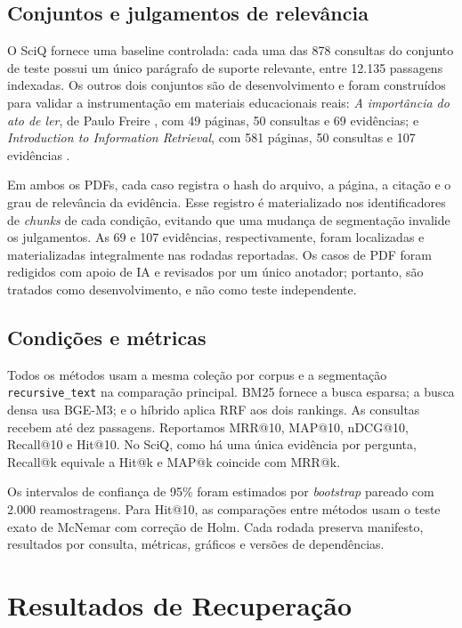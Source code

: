 \documentclass[12pt]{article}
\begin{document}
\subsection{Conjuntos e julgamentos de relevância}

O SciQ \cite{sciq2017} fornece uma baseline controlada: cada uma das 878
consultas do conjunto de teste possui um único parágrafo de suporte relevante,
entre 12.135 passagens indexadas. Os outros dois conjuntos são de
desenvolvimento e foram construídos para validar a instrumentação em materiais
educacionais reais: \textit{A importância do ato de ler}, de Paulo Freire
\cite{freire1989}, com 49 páginas, 50 consultas e 69 evidências; e
\textit{Introduction to Information Retrieval}, com 581 páginas, 50 consultas
e 107 evidências \cite{manning2008}.

Em ambos os PDFs, cada caso registra o hash do arquivo, a página, a citação e
o grau de relevância da evidência. Esse registro é materializado nos
identificadores de \textit{chunks} de cada condição, evitando que uma mudança
de segmentação invalide os julgamentos. As 69 e 107 evidências, respectivamente,
foram localizadas e materializadas integralmente nas rodadas reportadas. Os
casos de PDF foram redigidos com apoio de IA e revisados por um único anotador;
portanto, são tratados como desenvolvimento, e não como teste independente.

\subsection{Condições e métricas}

Todos os métodos usam a mesma coleção por corpus e a segmentação
\texttt{recursive\_text} na comparação principal. BM25 fornece a busca
esparsa; a busca densa usa BGE-M3; e o híbrido aplica RRF aos dois rankings.
As consultas recebem até dez passagens. Reportamos MRR@10, MAP@10, nDCG@10,
Recall@10 e Hit@10. No SciQ, como há uma única evidência por pergunta,
Recall@k equivale a Hit@k e MAP@k coincide com MRR@k.

Os intervalos de confiança de 95\% foram estimados por \textit{bootstrap}
pareado com 2.000 reamostragens. Para Hit@10, as comparações entre métodos usam
o teste exato de McNemar com correção de Holm. Cada rodada preserva manifesto,
resultados por consulta, métricas, gráficos e versões de dependências.

\section{Resultados de Recuperação}
\end{document}
